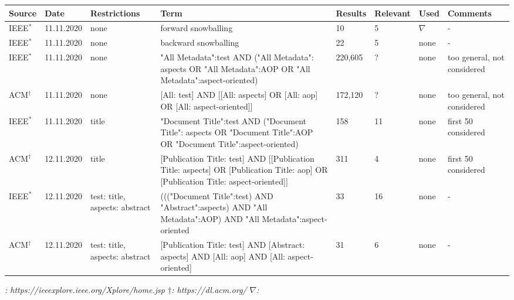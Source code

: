 \newpage
{}
\begin{landscape}

\begin{table}
\caption{\textbf{Literature Research Documentation.}}
\begin{longtable}{|p{1.3cm}|p{1.8cm}|>{\raggedright}p{2.3cm}|>{\raggedright}p{6cm}|p{1.5cm}|p{1.5cm}|p{1.2cm}|p{2cm}|}

\hline
\textbf{Source} & \textbf{Date} & \textbf{Restrictions} & \textbf{Term} & \textbf{Results} & \textbf{Relevant} & \textbf{Used} & \textbf{Comments}\\
\hline
IEEE$^*$ & 11.11.2020 & none & forward snowballing & 10 & 5 & $\nabla$ & -\\
\hline
IEEE$^*$ & 11.11.2020 & none & backward snowballing & 22 & 5 & none & -\\
\hline
IEEE$^*$ & 11.11.2020 & none & "All Metadata":test AND ("All Metadata": aspects OR "All Metadata":AOP OR "All Metadata":aspect-oriented) & 220,605 & ? & none & too general, not considered\\
\hline
ACM$^\dagger$ & 11.11.2020 & none & [All: test] AND [[All: aspects] OR [All: aop] OR [All: aspect-oriented]] & 172,120 & ? & none & too general, not considered\\
\hline
IEEE$^*$ & 11.11.2020 & title &"Document Title":test AND ("Document Title": aspects OR "Document Title":AOP OR "Document Title":aspect-oriented) & 158 & 11 & none & first 50 considered\\
\hline
ACM$^\dagger$ & 12.11.2020 & title &[Publication Title: test] AND [[Publication Title: aspects] OR [Publication Title: aop] OR [Publication Title: aspect-oriented]] & 311 & 4 & none & first 50 considered\\
\hline
IEEE$^*$ & 12.11.2020 & test: title, aspects: abstract &((("Document Title":test) AND "Abstract":aspects) AND "All Metadata":AOP) AND "All Metadata":aspect-oriented & 33 & 16 & none & -\\
\hline
ACM$^\dagger$ & 12.11.2020 & test: title, aspects: abstract &[Publication Title: test] AND [Abstract: aspects] AND [All: aop] AND [All: aspect-oriented] & 31 & 6 & none & -\\
\hline
\end{longtable}
\textit{\qquad \qquad \qquad \qquad \qquad *: https://ieeexplore.ieee.org/Xplore/home.jsp \quad $\dagger$: https://dl.acm.org/ \quad $\nabla$: \cite{Duclos}}
\label{doc}
\end{table}

\end{landscape}
\restoregeometry

